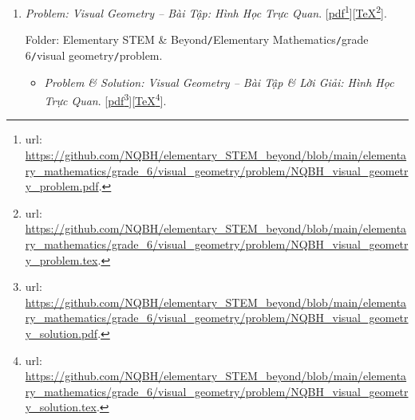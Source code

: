 \documentclass[12pt,oneside]{book}
\begin{document}
\begin{enumerate}
	Folder: {\sf Elementary STEM \& Beyond{\tt/}Elementary Mathematics{\tt/}grade 6{\tt/}integer{\tt/}problem}.
	\begin{itemize}
		\item {\it Problem \& Solution: Integers $\mathbb{Z}$ -- Bài Tập \& Lời Giải: Số Nguyên $\mathbb{Z}$}.
		
		Folder: {\sf Elementary STEM \& Beyond{\tt/}Elementary Mathematics{\tt/}grade 6{\tt/}integer{\tt/}solution}: [\href{https://github.com/NQBH/elementary_STEM_beyond/blob/main/elementary_mathematics/grade_6/integer/problem/NQBH_integer_solution.pdf}{pdf}\footnote{{\sc url}: \url{https://github.com/NQBH/elementary_STEM_beyond/blob/main/elementary_mathematics/grade_6/integer/problem/NQBH_integer_solution.pdf}.}][\href{https://github.com/NQBH/elementary_STEM_beyond/blob/main/elementary_mathematics/grade_6/integer/problem/NQBH_integer_solution.tex}{\TeX}\footnote{{\sc url}: \url{https://github.com/NQBH/elementary_STEM_beyond/blob/main/elementary_mathematics/grade_6/integer/problem/NQBH_integer_solution.tex}.}].
	\end{itemize}
	\item {\it Problem: Visual Geometry -- Bài Tập: Hình Học Trực Quan}. [\href{https://github.com/NQBH/elementary_STEM_beyond/blob/main/elementary_mathematics/grade_6/visual_geometry/problem/NQBH_visual_geometry_problem.pdf}{pdf}\footnote{{\sc url}: \url{https://github.com/NQBH/elementary_STEM_beyond/blob/main/elementary_mathematics/grade_6/visual_geometry/problem/NQBH_visual_geometry_problem.pdf}.}][\href{https://github.com/NQBH/elementary_STEM_beyond/blob/main/elementary_mathematics/grade_6/visual_geometry/problem/NQBH_visual_geometry_problem.tex}{\TeX}\footnote{{\sc url}: \url{https://github.com/NQBH/elementary_STEM_beyond/blob/main/elementary_mathematics/grade_6/visual_geometry/problem/NQBH_visual_geometry_problem.tex}.}].
	
	Folder: {\sf Elementary STEM \& Beyond{\tt/}Elementary Mathematics{\tt/}grade 6{\tt/}visual geometry{\tt/}problem}.
	\begin{itemize}
		\item {\it Problem \& Solution: Visual Geometry -- Bài Tập \& Lời Giải: Hình Học Trực Quan}. [\href{https://github.com/NQBH/elementary_STEM_beyond/blob/main/elementary_mathematics/grade_6/visual_geometry/problem/NQBH_visual_geometry_solution.pdf}{pdf}\footnote{{\sc url}: \url{https://github.com/NQBH/elementary_STEM_beyond/blob/main/elementary_mathematics/grade_6/visual_geometry/problem/NQBH_visual_geometry_solution.pdf}.}][\href{https://github.com/NQBH/elementary_STEM_beyond/blob/main/elementary_mathematics/grade_6/visual_geometry/problem/NQBH_visual_geometry_solution.tex}{\TeX}\footnote{{\sc url}: \url{https://github.com/NQBH/elementary_STEM_beyond/blob/main/elementary_mathematics/grade_6/visual_geometry/problem/NQBH_visual_geometry_solution.tex}.}].
		

\end{itemize}
\end{enumerate}
\end{document}
